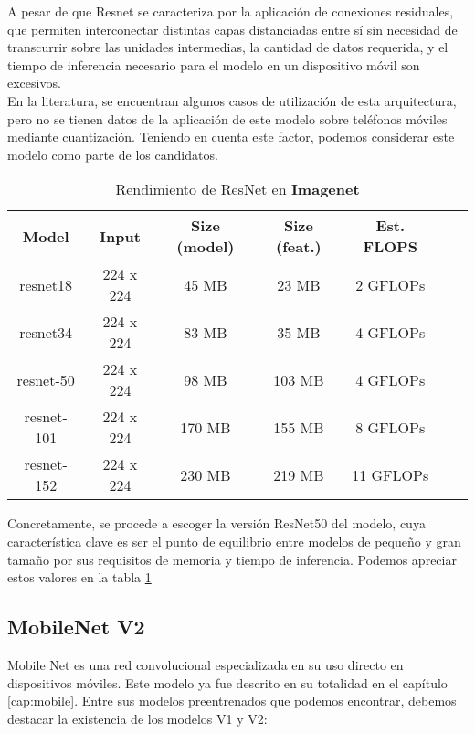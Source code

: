 A pesar de que Resnet se caracteriza por la aplicación de conexiones residuales, que permiten interconectar distintas capas distanciadas entre sí sin necesidad de transcurrir sobre las unidades intermedias, la cantidad de datos requerida, y el tiempo de inferencia necesario para el modelo en un dispositivo móvil son excesivos.\\

En la literatura, se encuentran algunos casos de utilización de esta arquitectura, pero no se tienen datos de la aplicación de este modelo sobre teléfonos móviles mediante cuantización. Teniendo en cuenta este factor, podemos considerar este modelo como parte de los candidatos.


\begin{table}[H]
	\centering
	\label{fig:tablaresnet}
	\begin{tabular}{|c|c|c|c|c|c|c|}
		\hline
		\textbf{Model} & \textbf{ Input} & \textbf {Size (model)} & \textbf{Size (feat.)} & \textbf{Est. FLOPS} \\ \hline
		resnet18 & 224 x 224 & 45 MB & 23 MB & 2 GFLOPs  \\ \hline
		resnet34 & 224 x 224 & 83 MB & 35 MB & 4 GFLOPs   \\ \hline
		resnet-50 & 224 x 224 & 98 MB & 103 MB & 4 GFLOPs   \\ \hline
		resnet-101 & 224 x 224 & 170 MB & 155 MB & 8 GFLOPs  \\ \hline
		resnet-152 & 224 x 224 & 230 MB & 219 MB & 11 GFLOPs   \\ \hline
	\end{tabular}
	\caption{Rendimiento de ResNet en \textbf{Imagenet} \cite{resnetspecs}}
\end{table}

Concretamente, se procede a escoger la versión ResNet50 del modelo, cuya característica clave es ser el punto de equilibrio entre modelos de pequeño y gran tamaño por sus requisitos de memoria y tiempo de inferencia. Podemos apreciar estos valores en la tabla \ref{fig:tablaresnet}



\subsection{MobileNet V2}

Mobile Net es una red convolucional especializada en su uso directo en dispositivos móviles. Este modelo ya fue descrito en su totalidad en el capítulo \ref{cap:mobile}. Entre sus modelos preentrenados que podemos encontrar, debemos destacar la existencia de los modelos V1 y V2:

